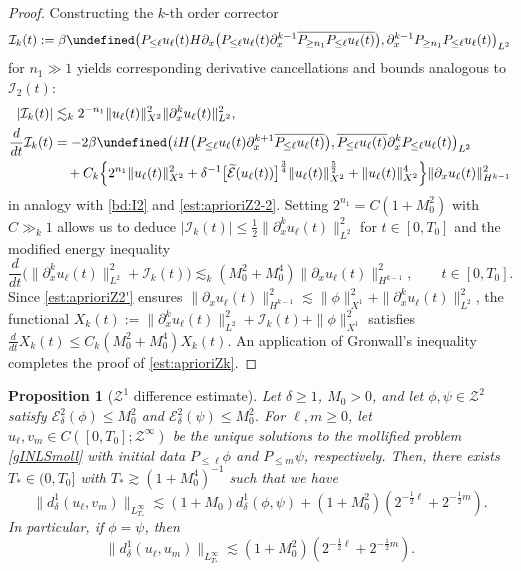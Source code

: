 \documentclass{amsart}
\newtheorem{proposition}{Proposition}[section]
\numberwithin{equation}{section}
\let\Re=\undefined\DeclareMathOperator{\Re}{Re}
\begin{document}
\begin{proof}
Constructing the $k$-th order corrector 
$$
    \mathcal{I}_k(t) := \beta\Re \big( P_{\leq \ell}u_\ell(t)H\partial_x\big(P_{\leq \ell}u_\ell(t)\partial_x^{k-1}\overline{P_{\geq n_1}P_{\leq \ell}u_\ell(t)}\big) ,\partial_x^{k-1}P_{\geq n_1}P_{\leq \ell}u_\ell(t)\big)_{L^2}
$$
for $n_1 \gg 1$ yields corresponding derivative cancellations and bounds analogous to $\mathcal{I}_2(t)$:
\begin{align*}
|\mathcal{I}_k(t)|
&\lesssim_k 2^{-n_1}\| u_\ell(t) \|_{X^2}^2\| \partial_x^k u_\ell(t) \|_{L^2}^2, \\
\frac{d}{dt}\mathcal{I}_k(t)&=- 2\beta \Re \big( iH\big(P_{\leq \ell}u_\ell(t)\partial_x^{k+1}\overline{P_{\leq \ell}u_\ell(t)}\big) ,\overline{P_{\leq \ell}u_\ell(t)}\partial_x^kP_{\leq \ell}u_\ell(t)\big)_{L^2} \\
&\quad +C_k\Big\{ 2^{n_1}\| u_\ell(t)\|_{X^2}^2+ \delta^{-1}\big[ \widetilde{\mathcal{E}}(u_\ell(t))\big] ^{\frac34}\| u_\ell(t)\|_{X^2}^{\frac52}+\| u_\ell(t)\|_{X^2}^4\Big\} \| \partial_xu_\ell(t)\|_{H^{k-1}}^2
\end{align*}
in analogy with \eqref{bd:I2} and \eqref{est:aprioriZ2-2}.
Setting $2^{n_1} = C(1+M_0^2)$ with $C\gg _k 1$ allows us to deduce $|\mathcal{I}_k(t)| \leq \frac{1}{2} \| \partial_x^k u_\ell(t) \|_{L^2}^2$ for $t\in[0, T_0]$ and the modified energy inequality
$$\frac{d}{dt}\big( \| \partial_x^ku_\ell(t) \|_{L^2}^2+\mathcal{I}_k(t)\big) \lesssim_k (M_0^2+M_0^4)\| \partial_xu_\ell(t) \|_{H^{k-1}}^2,\qquad t\in [0,T_0]. $$Since \eqref{est:aprioriZ2'} ensures $\| \partial_xu_\ell(t) \|_{H^{k-1}}^2 \lesssim \| \phi \|_{X^1}^2 + \| \partial_x^ku_\ell(t) \|_{L^2}^2$, the functional $X_k(t) := \| \partial_x^ku_\ell(t) \|_{L^2}^2+\mathcal{I}_k(t)+\| \phi \|_{X^1}^2$ satisfies $\frac{d}{dt}X_k(t) \leq C_k(M_0^2+M_0^4)X_k(t)$. An application of Gronwall's inequality completes the proof of \eqref{est:aprioriZk}.
\end{proof}



\begin{proposition}[$\mathcal{Z}^1$ difference estimate]\label{prop:apriori-d1}
Let $\delta\geq 1$, $M_0>0$, and let $\phi, \psi \in \mathcal{Z}^2$ satisfy $\mathcal{E}^2_\delta(\phi) \leq M_0^2$ and $\mathcal{E}^2_\delta(\psi)\leq M_0^2$. 
 For $\ell,m\geq 0$, let $u_\ell,v_m\in C([0,T_0];\mathcal{Z}^\infty)$ be the unique solutions to the mollified problem \eqref{gINLSmoll} with initial data $P_{\leq \ell}\phi$ and $P_{\leq m}\psi$, respectively.
Then, there exists $T_*\in (0,T_0]$ with $T_*\gtrsim (1+M_0^4)^{-1}$ such that we have
\begin{equation}\label{est:apriorid1}
\| d^1_\delta(u_{\ell},v_{m})\|_{L_{T_*}^{\infty}} \lesssim (1+M_0)d^1_\delta(\phi,\psi) +(1+M_0^2)(2^{-\frac{1}{2}\ell} +2^{-\frac{1}{2}m}).
\end{equation}
In particular, if $\phi=\psi$, then  
\begin{equation}\label{est:apriorid1'}
\| d^1_\delta(u_{\ell}, u_{m}) \|_{L_{T_*}^{\infty}} \lesssim (1+M_0^2)(2^{-\frac{1}{2}\ell} +2^{-\frac{1}{2}m}). 
\end{equation}
\end{proposition}
\end{document}
